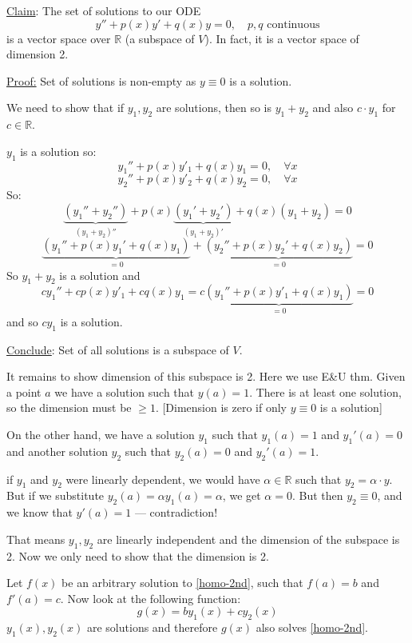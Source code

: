 \documentclass{article}
\newcommand{\tmtextbf}[1]{\text{{\bfseries{#1}}}}
\begin{document}
{\underline{Claim}}: The set of solutions to our ODE
\begin{equation}
  y'' + p (x) y' + q (x) y = 0, \quad p, q \text{ continuous} \label{homo-2nd}
\end{equation}
is a vector space over $\mathbb{R}$ (a subspace of $V$). In fact, it is a
vector space of dimension 2.

{\underline{Proof:}} Set of solutions is non-empty as $y \equiv 0$ is a
solution.

We need to show that if $y_1, y_2$ are solutions, then so is $y_1 + y_2$ and
also $c \cdot y_1$ for $c \in \mathbb{R}$.

$y_1$ is a solution so:
\[ y_1'' + p (x) y'_1 + q (x) y_1 = 0, \quad \forall x \]
\[ y_2'' + p (x) y'_2 + q (x) y_2 = 0, \quad \forall x \]
So:
\[ \underbrace{(y_1'' + y_2'')}_{(y_1 + y_2)''} + p (x)  \underbrace{(y_1' +
   y_2')}_{(y_1 + y_2)'} + q (x)  (y_1 + y_2) = 0 \]
\[ \underbrace{(y_1'' + p (x) y_1' + q (x) y_1)}_{= 0} + \underbrace{(y_2'' +
   p (x) y_2' + q (x) y_2)}_{= 0} = 0 \]
So $y_1 + y_2$ is a solution and
\[ cy_1'' + cp (x) y'_1 + cq (x) y_1 = c \underbrace{(y_1'' + p (x) y'_1 + q
   (x) y_1)}_{= 0} = 0 \]
and so $cy_1$ is a solution.

{\underline{Conclude}}: Set of all solutions is a subspace of $V$.

It remains to show dimension of this subspace is 2. Here we use E\&U thm.
Given a point $a$ we have a solution such that $y (a) = 1$. There is at least
one solution, so the dimension must be $\geq 1$. [Dimension is zero if only $y
\equiv 0$ is a solution]

On the other hand, we have a solution $y_1$ such that $y_1 (a) = 1$ and $y_1'
(a) = 0$ and another solution $y_2$ such that $y_2 (a) = 0$ and $y_2' (a) =
1$.

if $y_1$ and $y_2$ were linearly dependent, we would have $\alpha \in
\mathbb{R}$ such that $y_2 = \alpha \cdot y$. But if we substitute $y_2 (a) =
\alpha y_1 (a) = \alpha$, we get $\alpha = 0$. But then $y_2 \equiv 0$, and we
know that $y' (a) = 1$ --- contradiction!

That means $y_1, y_2$ are linearly independent and the dimension of the
subspace is \tmtextbf{at least} 2. Now we only need to show that the dimension
is \tmtextbf{exactly} 2.

Let $f (x)$ be an arbitrary solution to
\eqref{homo-2nd}, such that $f (a) = b$ and $f' (a) = c$. Now look at the
following function:
\[ g (x) = by_1 (x) + cy_2 (x) \]
$y_1 (x), y_2 (x)$ are solutions and therefore $g (x)$ also solves
\eqref{homo-2nd}.
\end{document}

